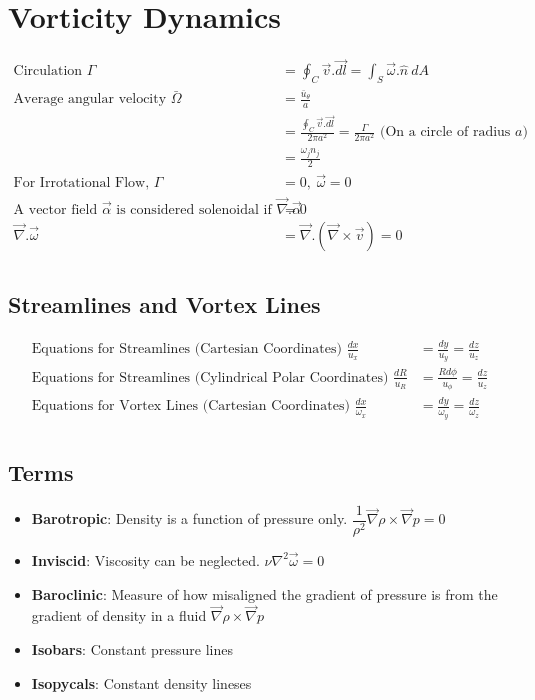 \documentclass[11pt, letterpaper, notitlepage]{article}
\begin{document}
\section{Vorticity Dynamics}
\begin{align*}
\text{Circulation } \Gamma &= \oint_{C}^{} \vec{v} . \vec{dl} = \int_{S}^{} \vec{\omega}.\hat{n}\ dA \\ 
\text{Average angular velocity } \bar{\Omega} &= \frac{\bar{u}_{\theta}}{a} \\ &= \frac{\oint_{C}^{} \vec{v}.\vec{dl}}{2 \pi a^2} =  \frac{\Gamma}{2 \pi a^2} \text{ (On a circle of radius } a\text{)} \\ &= \frac{{\omega}_j n_j}{2}\\
\text{For Irrotational Flow, } \Gamma &= 0,\ \vec{\omega} = 0 \\
\text{A vector field } \vec{\alpha} \text{ is considered solenoidal if } \vec{\nabla} . \vec{\alpha} &= 0 \\
\vec{\nabla}.\vec{\omega} &= \vec{\nabla}.(\vec{\nabla} \times \vec{v}) = 0 \\
\end{align*}

\subsection{Streamlines and Vortex Lines}
\begin{align*}
\text{Equations for Streamlines (Cartesian Coordinates) } \frac{dx}{u_x} &= \frac{dy}{u_y} = \frac{dz}{u_z} \\
\text{Equations for Streamlines (Cylindrical Polar Coordinates) } \frac{dR}{u_R} &= \frac{R d \phi}{u_\phi} = \frac{dz}{u_z} \\
\text{Equations for Vortex Lines (Cartesian Coordinates) } \frac{dx}{\omega_x} &= \frac{dy}{\omega_y} = \frac{dz}{\omega_z} \\
\end{align*}

\subsection{Terms}
\begin{itemize}
\item \textbf{Barotropic}: Density is a function of pressure only. $\dfrac{1}{\rho^2} \vec{\nabla} \rho \times \vec{\nabla} p = 0$ 
\item \textbf{Inviscid}: Viscosity can be neglected. $\nu \nabla^2 \vec{\omega} = 0$ 
\item \textbf{Baroclinic}: Measure of how misaligned the gradient of pressure is from the gradient of density in a fluid $\vec{\nabla} \rho \times \vec{\nabla} p$
\item \textbf{Isobars}: Constant pressure lines
\item \textbf{Isopycals}: Constant density lineses
\end{itemize}
\end{document}
